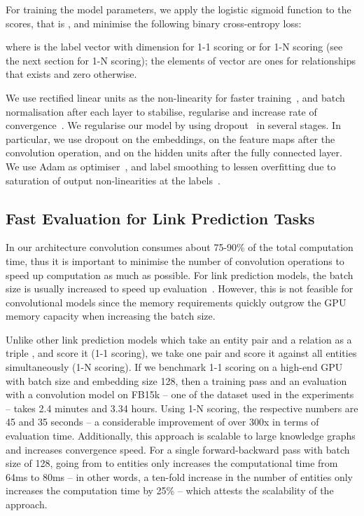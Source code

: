 \documentclass[letterpaper]{article}
\newcommand{\citep}{\cite}
\begin{document}
For training the model parameters, we apply the logistic sigmoid function  to the scores, that is , and minimise the following binary cross-entropy loss:

where  is the label vector with dimension  for 1-1 scoring or  for 1-N scoring (see the next section for 1-N scoring); the elements of vector  are ones for relationships that exists and zero otherwise.


We use rectified linear units as the non-linearity  for faster training~\citep{krizhevsky2012imagenet}, and batch normalisation after each layer to stabilise, regularise and increase rate of convergence~\citep{ioffe2015batch}.
We regularise our model by using dropout~\citep{srivastava2014dropout} in several stages.
In particular, we use dropout on the embeddings, on the feature maps after the convolution operation, and on the hidden units after the fully connected layer.
We use Adam as optimiser~\citep{kingma2014adam}, and label smoothing to lessen overfitting due to saturation of output non-linearities at the labels~\citep{szegedy2016rethinking}.


\subsection{Fast Evaluation for Link Prediction Tasks}
\label{onetoN}

In our architecture convolution consumes about 75-90\% of the total computation time, thus it is important to minimise the number of convolution operations to speed up computation as much as possible.
For link prediction models, the batch size is usually increased to speed up evaluation~\citep{bordes2013translating}.
However, this is not feasible for convolutional models since the memory requirements quickly outgrow the GPU memory capacity when increasing the batch size.


Unlike other link prediction models which take an entity pair and a relation as a triple , and score it (1-1 scoring), we take one  pair and score it against all entities  simultaneously (1-N scoring).
If we benchmark 1-1 scoring on a high-end GPU with batch size and embedding size 128, then a training pass and an evaluation with a convolution model on FB15k -- one of the dataset used in the experiments -- takes 2.4 minutes and 3.34 hours.
Using 1-N scoring, the respective numbers are 45 and 35 seconds -- a considerable improvement of over 300x in terms of evaluation time.
Additionally, this approach is scalable to large knowledge graphs and increases convergence speed.
For a single forward-backward pass with batch size of 128, going from  to  entities only increases the computational time from 64ms to 80ms -- in other words, a ten-fold increase in the number of entities only increases the computation time by 25\% -- which attests the scalability of the approach. 
\end{document}
